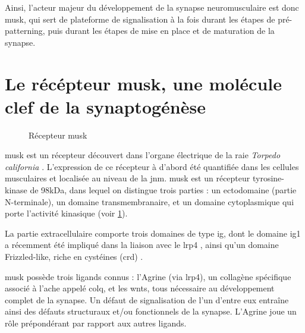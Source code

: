 	Ainsi, l'acteur majeur du développement de la synapse neuromusculaire est donc \gls{musk}, qui sert de plateforme de signalisation à la fois durant les étapes de pré-patterning, puis durant les étapes de mise en place et de maturation de la synapse.
		
\section{Le récépteur \acrshort{musk}, une molécule clef de la synaptogénèse}
\label{sec:IntroMuSK}	

	\begin{figure}
		\caption{Récepteur \gls{musk}}
		\label{fig:RMuSK}
	\end{figure}
	
	\acrfull{musk} est un récepteur découvert dans l'organe électrique de la raie \emph{Torpedo california} \cite{Jennings1993}. L'expression de ce récepteur à d'abord été quantifiée dans les cellules musculaires et localisée au niveau de la \gls{jnm}. \gls{musk} est un récepteur tyrosine-kinase de 98kDa, dans lequel on distingue trois parties : un ectodomaine (partie N-terminale), un domaine transmembranaire, et un domaine cytoplasmique qui porte l'activité kinasique (voir \cref{fig:RMuSK}). 
	
	La partie extracellulaire comporte trois domaines de type \gls{ig}, dont le domaine \gls{ig}1 a récemment été impliqué dans la liaison avec le \gls{lrp}4 \cite{Zhang2011}, ainsi qu'un domaine Frizzled-like, riche en cystéines (\gls{crd}) \cite{Jing2009}.
	
	\gls{musk} possède trois ligands connus : l'Agrine (via \acrshort{lrp}4), un collagène spécifique associé à l'\Gls{ache} appelé \acrshort{colq}, et les \Glspl{wnt}, tous nécessaire au développement complet de la synapse. Un défaut de signalisation de l'un d'entre eux entraîne ainsi des défauts structuraux et/ou fonctionnels de la synapse. L'Agrine joue un rôle prépondérant par rapport aux autres ligands.
	

